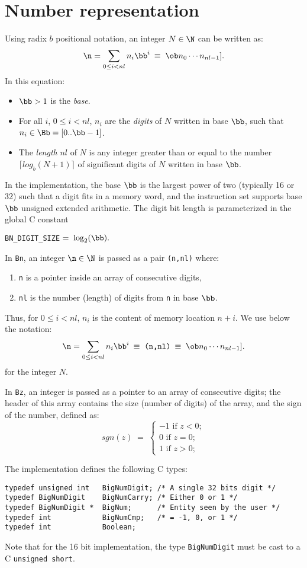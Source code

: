 \section{Number representation}
Using radix $b$ positional notation, an integer $N \in \N$ can be
written as:
$$ \n = \sum_{0 \leq i < nl} n_{i} \bb^i 
\: \equiv \; \ob n_0 \cdots n_{nl-1}].
$$
In this equation:
\begin{itemize}
  \item $\bb > 1$ is the {\em base}.
  \item For all $i$, $0 \leq i < nl$, $n_i$ are the {\em digits}
  of $N$ written in base $\bb$, such that $n_i \in \Bb= [0..\bb -1]$.
  \item The {\em length} $nl$ of $N$ is any integer greater than or
  equal to the number $\lceil log_b(N+1) \rceil$ of significant
  digits of $N$ written in base $\bb$.
\end{itemize}
In the implementation, the base $\bb$ is the largest power of two
(typically 16 or 32) such that a digit
fits in a memory word, and the  instruction set supports base $\bb$
unsigned extended arithmetic. The digit bit length is parameterized
in the global C constant 
\begin{center}
\verb+BN_DIGIT_SIZE+$ \; = \; \log_2(\bb).$
\end{center}
In \verb+Bn+, an integer $\n \in \N$ is passed as a
pair \verb+(n,nl)+ where:
\begin{enumerate}
  \item \verb+n+ is a pointer inside an array of consecutive digits,
  \item \verb+nl+ is the number (length) of digits from \verb+n+ in base $\bb$.
\end{enumerate}
Thus, for $0 \leq i < nl$, $n_i$ is the content of memory location
$n+i$. We use below the notation:
$$ \n = \sum_{0 \leq i < nl} n_{i} \bb^i \: \equiv \; \verb+(n,nl)+ 
\: \equiv \; \ob n_0 \cdots n_{nl-1}].
$$
for the integer $N$.

 In \verb+Bz+, an integer is passed as a  pointer to an array of
consecutive digits; the header of this array contains the size (number of
digits) of the array, and the sign of the  number, defined as:
$$
sgn(z) \; = \; \left\{ 
\begin{array}{r} -1 \mbox{ if } z<0; \\  0 \mbox{ if } z=0; \\  1 \mbox{ if } 
z>0; 
\end{array} \right. $$

\clearpage
The implementation defines the following C types:
\begin{verbatim}
typedef unsigned int   BigNumDigit; /* A single 32 bits digit */
typedef BigNumDigit    BigNumCarry; /* Either 0 or 1 */
typedef BigNumDigit *  BigNum;      /* Entity seen by the user */
typedef int            BigNumCmp;   /* = -1, 0, or 1 */
typedef int            Boolean;
\end{verbatim}
Note that for the 16 bit implementation, the type \verb+BigNumDigit+ must
be cast to a C \verb+unsigned short+.

